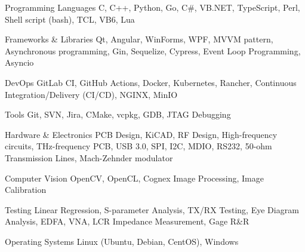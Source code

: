 
\begin{cvskills}

  \cvskill
    {Programming Languages} %
      {C, C++, Python, Go, C\#, VB.NET, TypeScript, Perl, Shell script (bash), TCL, VB6, Lua} %

  \cvskill
    {Frameworks \& Libraries} %
      {Qt, Angular, WinForms, WPF, MVVM pattern, Asynchronous programming, Gin, Sequelize, Cypress, Event Loop Programming, Asyncio} %

  \cvskill
    {DevOps} %
      {GitLab CI, GitHub Actions, Docker, Kubernetes, Rancher, Continuous Integration/Delivery (CI/CD), NGINX, MinIO} %

  \cvskill
    {Tools} %
    {Git, SVN, Jira, CMake, vcpkg, GDB, JTAG Debugging} %

  \cvskill
    {Hardware \& Electronics} %
    {PCB Design, KiCAD, RF Design, High-frequency circuits, THz-frequency PCB, USB 3.0, SPI, I2C, MDIO, RS232, 50-ohm Transmission Lines, Mach-Zehnder modulator} %

  \cvskill
    {Computer Vision} %
      {OpenCV, OpenCL, Cognex Image Processing, Image Calibration} %

  \cvskill
    {Testing} %
      {Linear Regression, S-parameter Analysis, TX/RX Testing, Eye Diagram Analysis, EDFA, VNA, LCR Impedance Measurement, Gage R\&R} %

  \cvskill
    {Operating Systems} %
    {Linux (Ubuntu, Debian, CentOS), Windows} %


\end{cvskills}
